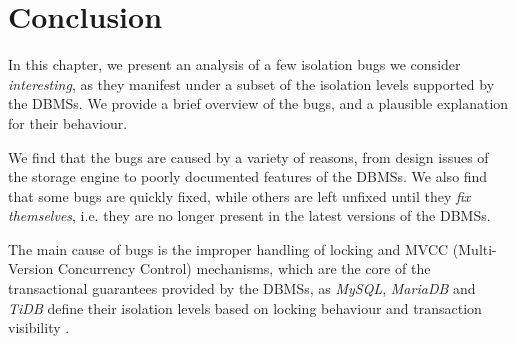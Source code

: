\section{Conclusion}

In this chapter, we present an analysis of a few isolation bugs we consider \textit{interesting}, as they manifest under a subset of the isolation levels supported by the DBMSs. We provide a brief overview of the bugs, and a plausible explanation for their behaviour.

We find that the bugs are caused by a variety of reasons, from design issues of the storage engine to poorly documented features of the DBMSs. We also find that some bugs are quickly fixed, while others are left unfixed until they \textit{fix themselves}, i.e. they are no longer present in the latest versions of the DBMSs.

The main cause of bugs is the improper handling of locking and MVCC (Multi-Version Concurrency Control) mechanisms, which are the core of the transactional guarantees provided by the DBMSs, as \textit{MySQL}, \textit{MariaDB} and \textit{TiDB} define their isolation levels based on locking behaviour and transaction visibility \cite{mysqlisolationlevels,mariadbtransactions,tidbisolationlevels}.
